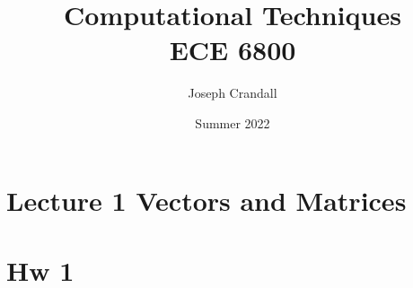 
\usepackage{algorithm, algpseudocode, color, gensymb, siunitx, soul, subfiles, verbatim}
\usepackage[a4paper, total={7.5in, 10in}]{geometry}

\title{Computational Techniques\\
\large ECE 6800}
\author{Joseph Crandall}
\date{Summer 2022}


\maketitle






\section{Lecture 1 Vectors and Matrices}


\section{Hw 1}


